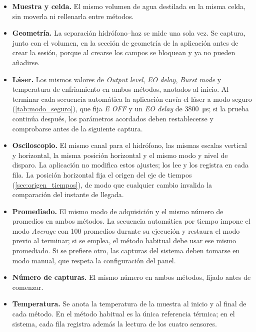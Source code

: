 \begin{itemize}[leftmargin=*, itemsep=2pt]
  \item \textbf{Muestra y celda.} El mismo volumen de agua destilada en
    la misma celda, sin moverla ni rellenarla entre métodos.
  \item \textbf{Geometría.} La separación hidrófono--haz se mide una
    sola vez. Se captura, junto con el volumen, en la sección de
    geometría de la aplicación antes de crear la sesión, porque al
    crearse los campos se bloquean y ya no pueden añadirse.
  \item \textbf{Láser.} Los mismos valores de \textit{Output level},
    \textit{EO delay}, \textit{Burst mode} y temperatura de
    enfriamiento en ambos métodos, anotados al inicio. Al terminar cada
    secuencia automática la aplicación envía el láser a modo seguro
    (\cref{tab:modo_seguro}), que fija \textit{E OFF} y un
    \textit{EO delay} de \SI{3800}{\micro\second}; si la prueba
    continúa después, los parámetros acordados deben restablecerse y
    comprobarse antes de la siguiente captura.
  \item \textbf{Osciloscopio.} El mismo canal para el hidrófono, las
    mismas escalas vertical y horizontal, la misma posición horizontal
    y el mismo modo y nivel de disparo. La aplicación no modifica estos
    ajustes; los lee y los registra en cada fila. La posición horizontal
    fija el origen del eje de tiempos (\cref{sec:origen_tiempos}), de
    modo que cualquier cambio invalida la comparación del instante de
    llegada.
  \item \textbf{Promediado.} El mismo modo de adquisición y el mismo
    número de promedios en ambos métodos. La secuencia automática por
    tiempo impone el modo \textit{Average} con 100 promedios durante su
    ejecución y restaura el modo previo al terminar; si se emplea, el
    método habitual debe usar ese mismo promediado. Si se prefiere otro,
    las capturas del sistema deben tomarse en modo manual, que respeta
    la configuración del panel.
  \item \textbf{Número de capturas.} El mismo número en ambos métodos,
    fijado antes de comenzar.
  \item \textbf{Temperatura.} Se anota la temperatura de la muestra al
    inicio y al final de cada método. En el método habitual es la única
    referencia térmica; en el sistema, cada fila registra además la
    lectura de los cuatro sensores.
\end{itemize}

